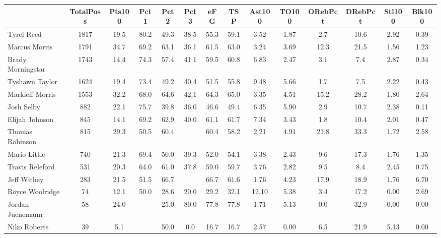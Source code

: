 \documentclass[10pt,letterpaper]{article}
\begin{document}
\begin{table}[ht]
\begin{center}
\begin{tabular}{lccccccccccccc}
  \hline
 & TotalPoss & Pts100 & Pct1 & Pct2 & Pct3 & eFG & TSP & Ast100 & TO100 & ORebPct & DRebPct & Stl100 & Blk100 \\ 
  \hline
Tyrel Reed & 1817 & 19.5 & 80.2 & 49.3 & 38.5 & 55.3 & 59.1 & 3.52 & 1.87 & 2.7 & 10.6 & 2.92 & 0.39 \\ 
  Marcus Morris & 1791 & 34.7 & 69.2 & 63.1 & 36.1 & 61.5 & 63.0 & 3.24 & 3.69 & 12.3 & 21.5 & 1.56 & 1.23 \\ 
  Brady Morningstar & 1743 & 14.4 & 74.3 & 57.4 & 41.1 & 59.5 & 60.8 & 6.83 & 2.47 & 3.1 & 7.4 & 2.87 & 0.34 \\ 
  Tyshawn Taylor & 1624 & 19.4 & 73.4 & 49.2 & 40.4 & 51.5 & 55.8 & 9.48 & 5.66 & 1.7 & 7.5 & 2.22 & 0.43 \\ 
  Markieff Morris & 1553 & 32.2 & 68.0 & 64.6 & 42.1 & 64.3 & 65.0 & 3.35 & 4.51 & 15.2 & 28.2 & 1.80 & 2.64 \\ 
  Josh Selby & 882 & 22.1 & 75.7 & 39.8 & 36.0 & 46.6 & 49.4 & 6.35 & 5.90 & 2.9 & 10.7 & 2.38 & 0.11 \\ 
  Elijah Johnson & 845 & 14.1 & 69.2 & 62.9 & 40.0 & 61.1 & 61.7 & 7.34 & 3.43 & 1.8 & 10.4 & 2.01 & 0.47 \\ 
  Thomas Robinson & 815 & 29.3 & 50.5 & 60.4 &  & 60.4 & 58.2 & 2.21 & 4.91 & 21.8 & 33.3 & 1.72 & 2.58 \\ 
  Mario Little & 740 & 21.3 & 69.4 & 50.0 & 39.3 & 52.0 & 54.1 & 3.38 & 2.43 & 9.6 & 17.3 & 1.76 & 1.35 \\ 
  Travis Releford & 531 & 20.3 & 64.0 & 61.0 & 37.8 & 59.0 & 59.7 & 3.76 & 2.82 & 9.5 & 8.4 & 2.45 & 0.75 \\ 
  Jeff Withey & 283 & 21.5 & 51.5 & 66.7 &  & 66.7 & 61.6 & 1.76 & 4.23 & 17.9 & 18.9 & 1.76 & 6.70 \\ 
  Royce Woolridge & 74 & 12.1 & 50.0 & 28.6 & 20.0 & 29.2 & 32.1 & 12.10 & 5.38 & 3.4 & 17.2 & 0.00 & 2.69 \\ 
  Jordan Juenemann & 58 & 24.0 &  & 25.0 & 80.0 & 77.8 & 77.8 & 1.71 & 5.13 & 0.0 & 32.9 & 0.00 & 0.00 \\ 
  Niko Roberts & 39 & 5.1 &  & 50.0 & 0.0 & 16.7 & 16.7 & 2.57 & 0.00 & 6.5 & 21.9 & 5.13 & 0.00 \\ 
   \hline
\end{tabular}
\end{center}
\end{table}
\end{document}
